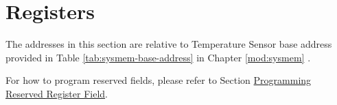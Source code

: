 \documentclass[main\_\_EN.tex]{subfiles}
\begin{document}


\newpage
\section{Registers}

The addresses in this section are relative to Temperature Sensor base address provided in Table \ref{tab:sysmem-base-address} in Chapter \ref{mod:sysmem} \textit{}.

For how to program reserved fields, please refer to Section \hyperref[programming-reserved-field]{Programming Reserved Register Field}.


\end{document}
